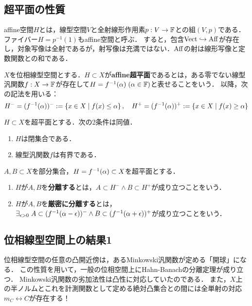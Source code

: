 \documentclass[uplatex,dvipdfmx]{jsreport}
\begin{document}
\subsection{超平面の性質}

\begin{definition}
    affine空間$H$とは，線型空間$V$と全射線形作用素$p:V\to\mathbb{F}$との組$(V,p)$である．ファイバー$H=p^{-1}(1)$もaffine空間と呼ぶ．
    すると，包含$\mathrm{Vect}\hookrightarrow\mathrm{Aff}$が存在し，対象写像は全射であるが，射写像は充満ではない．$\mathrm{Aff}$の射は線形写像と定数関数との和である．
\end{definition}

\begin{definition}
    $X$を位相線型空間とする．$H\subset X$が\textbf{affine超平面}であるとは，ある零でない線型汎関数$f:X\to\mathbb{F}$が存在して$H=f^{-1}(\alpha)\;(\alpha\in\mathbb{F})$と表せることをいう．
    以降，次の記法を用いる：
    \[H^-=(f^{-1}(\alpha))^-:=\left\{x\in X\mid f(x)\le\alpha\right\},\quad H^+=(f^{-1}(\alpha))^+:=\left\{x\in X\mid f(x)\ge\alpha\right\}\]
\end{definition}

\begin{proposition}
    $H\subset X$を超平面とする．次の2条件は同値．
    \begin{enumerate}
        \item $H$は閉集合である．
        \item 線型汎関数$f$は有界である．
    \end{enumerate}
\end{proposition}

\begin{definition}
    $A,B\subset X$を部分集合，$H=f^{-1}(\alpha)\subset X$を超平面とする．
    \begin{enumerate}
        \item $H$が$A,B$を\textbf{分離する}とは，$A\subset H^-\land B\subset H^+$が成り立つことをいう．
        \item $H$が$A,B$を\textbf{厳密に分離する}とは，$\exists_{\epsilon>0}\;A\subset (f^{-1}(\alpha-\epsilon))^-\land B\subset(f^{-1}(\alpha+\epsilon))^+$が成り立つことをいう．
    \end{enumerate}
\end{definition}

\subsection{位相線型空間上の結果1}

\begin{tcolorbox}[colframe=ForestGreen, colback=ForestGreen!10!white,breakable,colbacktitle=ForestGreen!40!white,coltitle=black,fonttitle=\bfseries\sffamily,
title=]
    位相線型空間の任意の凸開近傍は，あるMinkowski汎関数が定める「開球」になる．
    この性質を用いて，一般の位相空間上にHahn-Banachの分離定理が成り立つ．
    Minkowski汎関数の劣加法性は凸性に対応していたのである．
    また，$X$上の半ノルムとこれを計測関数として定める絶対凸集合との間には全単射の対応$m_C\leftrightarrow C$が存在する！
\end{tcolorbox}
\end{document}
